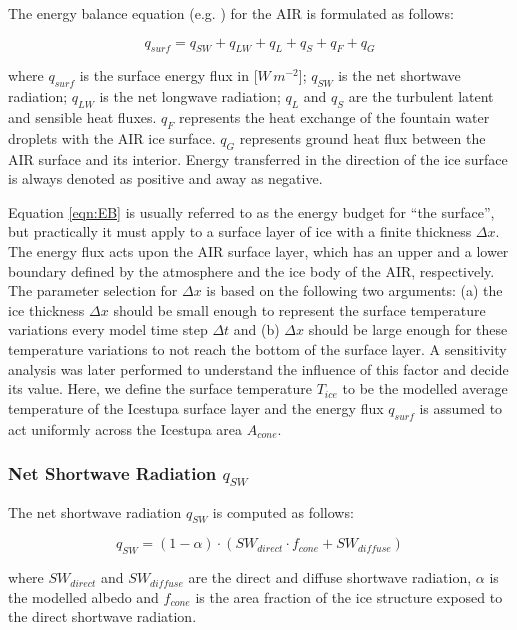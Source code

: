\documentclass[utf8]{frontiersSCNS}
\begin{document}
The energy balance equation (e.g. \cite{Hock_2005}) for the AIR is formulated as follows:

\begin{equation} q_{surf} = q_{SW} + q_{LW} + q_{L} + q_{S} + q_{F} + q_{G}\label{eqn:EB} \end{equation}

where $q_{surf}$ is the surface energy flux in [$W\,m^{-2}$]; $q_{SW}$ is the net shortwave radiation; $q_{LW}$
is the net longwave radiation; $q_{L}$ and $q_{S}$ are the turbulent latent and sensible heat fluxes. $q_{F}$
represents the heat exchange of the fountain water droplets with the AIR ice surface. $q_{G}$ represents ground
heat flux between the AIR surface and its interior. Energy transferred in the direction of the ice surface is
always denoted as positive and away as negative.

Equation \ref{eqn:EB} is usually referred to as the energy budget for “the surface”, but practically it must
apply to a surface layer of ice with a finite thickness $\Delta x$. The energy flux acts upon the AIR surface
layer, which has an upper and a lower boundary defined by the atmosphere and the ice body of the AIR,
respectively. The parameter selection for $\Delta x$ is based on the following two arguments: (a) the ice
thickness $\Delta x$ should be small enough to represent the surface temperature variations every model time
step $\Delta t$ and (b) $\Delta x$ should be large enough for these temperature variations to not reach the
bottom of the surface layer. A sensitivity analysis was later performed to understand the influence of this
factor and decide its value. Here, we define the surface temperature $T_{ice}$ to be the modelled average
temperature of the Icestupa surface layer and the energy flux $q_{surf}$ is assumed to act uniformly across the
Icestupa area $A_{cone}$.

\subsubsection{Net Shortwave Radiation \texorpdfstring{$q_{SW}$}{Lg}}

The net shortwave radiation $q_{SW}$ is computed as follows:

\begin{equation} q_{SW} = (1- \alpha)\cdot (SW_{direct} \cdot f_{cone} + SW_{diffuse}) \label{eqn:SW} \end{equation}

where $SW_{direct}$ and $SW_{diffuse}$ are the direct and diffuse shortwave radiation, $\alpha$ is the
modelled albedo and $f_{cone}$ is the area fraction of the ice structure exposed to the direct shortwave
radiation.
\end{document}
